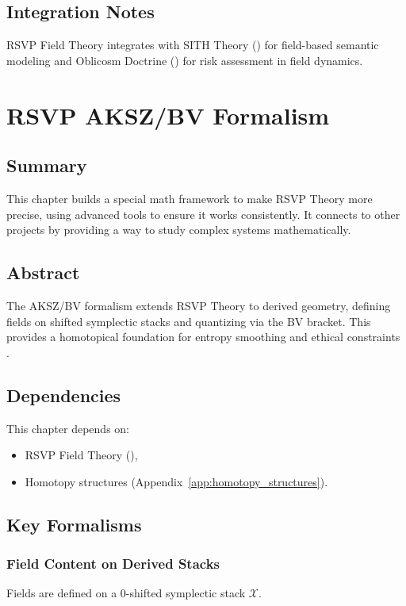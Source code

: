 \documentclass[11pt,oneside]{memoir}
\theoremstyle{plain}
\newcommand{\X}{\mathcal{X}}
\begin{document}
\section{Integration Notes}
RSVP Field Theory integrates with SITH Theory () for field-based semantic modeling and Oblicosm Doctrine () for risk assessment in field dynamics.

\chapter{RSVP AKSZ/BV Formalism}
\label{sec:rsvp_aksz}

\section{Summary}
This chapter builds a special math framework to make RSVP Theory more precise, using advanced tools to ensure it works consistently. It connects to other projects by providing a way to study complex systems mathematically.

\section{Abstract}
The AKSZ/BV formalism extends RSVP Theory to derived geometry, defining fields on shifted symplectic stacks and quantizing via the BV bracket. This provides a homotopical foundation for entropy smoothing and ethical constraints \cite{aksz}.

\section{Dependencies}
This chapter depends on:
\begin{itemize}
    \item RSVP Field Theory (),
    \item Homotopy structures (Appendix~\ref{app:homotopy_structures}).
\end{itemize}

\section{Key Formalisms}
\subsection{Field Content on Derived Stacks}
Fields are defined on a 0-shifted symplectic stack \(\X\).
\end{document}
